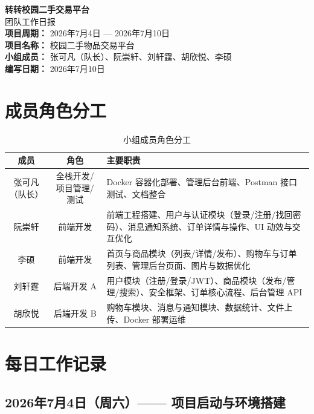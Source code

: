 \documentclass[12pt,a4paper,UTF8]{ctexart}
\begin{document}
\begin{titlepage}
\centering
\vspace*{3cm}
{\Huge\bfseries 转转校园二手交易平台\\[0.5cm]}
{\LARGE 团队工作日报}\\[1.5cm]
{\large \textbf{项目周期：} 2026年7月4日 — 2026年7月10日}\\
{\large \textbf{项目名称：} 校园二手物品交易平台}\\[0.3cm]
{\large \textbf{小组成员：} 张可凡（队长）、阮崇轩、刘轩霆、胡欣悦、李硕}\\[5cm]
\vfill
{\large \textbf{编写日期：} 2026年7月10日}
\end{titlepage}

\tableofcontents
\newpage

\section{成员角色分工}

\begin{table}[H]
\centering
\caption{小组成员角色分工}
\begin{tabularx}{\textwidth}{c c X}
\toprule
\textbf{成员} & \textbf{角色} & \textbf{主要职责} \\
\midrule
张可凡（队长） & 全栈开发/项目管理/测试 & Docker 容器化部署、管理后台前端、Postman 接口测试、文档整合 \\
\hline
阮崇轩 & 前端开发 & 前端工程搭建、用户与认证模块（登录/注册/找回密码）、消息通知系统、订单详情与操作、UI 动效与交互优化 \\
\hline
李硕 & 前端开发 & 首页与商品模块（列表/详情/发布）、购物车与订单列表、管理后台页面、图片与数据优化 \\
\hline
刘轩霆 & 后端开发 A & 用户模块（注册/登录/JWT）、商品模块（发布/管理/搜索）、安全框架、订单核心流程、后台管理 API \\
\hline
胡欣悦 & 后端开发 B & 购物车模块、消息与通知模块、数据统计、文件上传、Docker 部署运维 \\
\bottomrule
\end{tabularx}
\end{table}

\newpage
\section{每日工作记录}

\subsection{2026年7月4日（周六）—— 项目启动与环境搭建}
\end{document}
